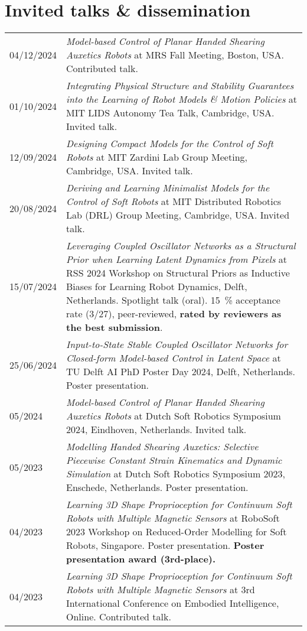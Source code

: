 \section*{Invited talks \& dissemination}
\noindent
\begin{longtable}{p{} p{}}
    04/12/2024 & \emph{Model-based Control of Planar Handed Shearing Auxetics Robots} at MRS Fall Meeting, Boston, USA. Contributed talk.\\
    01/10/2024 & \emph{Integrating Physical Structure and Stability Guarantees into the Learning of Robot Models \& Motion Policies} at MIT LIDS Autonomy Tea Talk, Cambridge, USA. Invited talk.\\
    12/09/2024 & \emph{Designing Compact Models for the Control of Soft Robots} at MIT Zardini Lab Group Meeting, Cambridge, USA. Invited talk.\\
    20/08/2024 & \emph{Deriving and Learning Minimalist Models for the Control of Soft Robots} at MIT Distributed Robotics Lab (DRL) Group Meeting, Cambridge, USA. Invited talk.\\
    15/07/2024 & \emph{Leveraging Coupled Oscillator Networks as a Structural Prior when Learning Latent Dynamics from Pixels} at RSS 2024 Workshop on Structural Priors as Inductive Biases for
    Learning Robot Dynamics, Delft, Netherlands. Spotlight talk (oral). \SI{15}{\percent} acceptance rate (3/27), peer-reviewed, \textbf{rated by reviewers as the best submission}.\\
    25/06/2024 & \emph{Input-to-State Stable Coupled Oscillator Networks for Closed-form Model-based Control in Latent Space} at TU Delft AI PhD Poster Day 2024, Delft, Netherlands. Poster presentation.\\
    05/2024 & \emph{Model-based Control of Planar Handed Shearing Auxetics Robots} at Dutch Soft Robotics Symposium 2024, Eindhoven, Netherlands. Invited talk.\\
    05/2023 & \emph{Modelling Handed Shearing Auxetics: Selective Piecewise Constant Strain Kinematics and Dynamic Simulation} at Dutch Soft Robotics Symposium 2023, Enschede, Netherlands. Poster presentation.\\
    04/2023 & \emph{Learning 3D Shape Proprioception for Continuum Soft Robots with Multiple Magnetic Sensors} at RoboSoft 2023 Workshop on Reduced-Order Modelling for Soft Robots, Singapore. Poster presentation. \textbf{Poster presentation award (3rd-place).}\\
    04/2023 & \emph{Learning 3D Shape Proprioception for Continuum Soft Robots with Multiple Magnetic Sensors} at 3rd International Conference on Embodied Intelligence, Online. Contributed talk.\\

\end{longtable}
